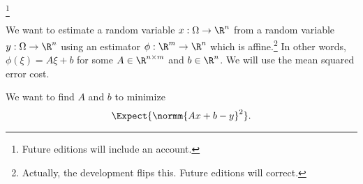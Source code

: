 

\footnote{Future editions will include an account.}


We want to estimate a random variable $x: \Omega \to \R^n$ from a random variable $y: \Omega \to \R^n$ using an estimator $\phi: \R^m \to \R^n$ which is affine.\footnote{Actually, the development flips this. Future editions will correct.}
In other words, $\phi(\xi) = A\xi + b$ for some $A \in \R^{n \times m}$ and $b \in \R^n$.
We will use the mean squared error cost.

We want to find $A$ and $b$ to minimize
$$
  \Expect{\normm{Ax + b - y}^2}.
$$
